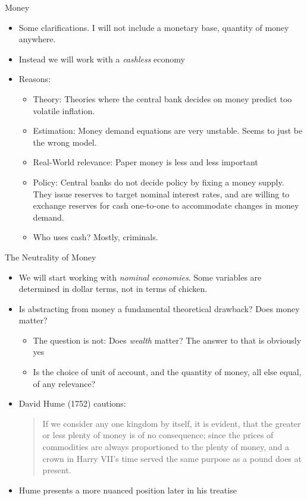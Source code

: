 \documentclass[11pt,aspectratio=169,xcolor={dvipsnames},hyperref={pdftex,pdfpagemode=UseNone,hidelinks,pdfdisplaydoctitle=true},usepdftitle=false]{beamer}
\begin{document}
\begin{frame}{Money}
\begin{itemize}
\item Some clarifications. I will not include a monetary base, quantity of money anywhere.
\item Instead we will work with a \textit{cashless} economy
\item Reasons:
\begin{itemize}
\item Theory: Theories where the central bank decides on money predict too volatile inflation.
\item Estimation: Money demand equations are very unstable. Seems to just be the wrong model.
\item Real-World relevance: Paper money is less and less important
\item Policy: Central banks do not decide policy by fixing a money supply. They issue reserves to target nominal interest rates, and are willing to exchange reserves for cash one-to-one to accommodate changes in money demand.
\item Who uses cash? Mostly, criminals.
\end{itemize}
\end{itemize}
\end{frame}

\begin{frame}{The Neutrality of Money}
\begin{itemize}
\item We will start working with \textit{nominal economies}. Some variables are determined in dollar terms, not in terms of chicken.
\item Is abstracting from money a fundamental theoretical drawback? Does money matter?
\begin{itemize}
\item The question is not: Does \textit{wealth} matter? The answer to that is obviously yes
\item Is the choice of unit of account, and the quantity of money, all else equal, of any relevance?
\end{itemize}
\item David Hume (1752) cautions:\\
\begin{quote}
\vspace{0.5cm}
If we consider any one kingdom by itself, it is evident, that the greater or less plenty
of money is of no consequence; since the prices of commodities are always proportioned to
the plenty of money, and a crown in Harry VII's time served the same purpose as a pound
does at present.
\end{quote}
\item Hume presents a more nuanced position later in his treatise
\end{itemize}
\end{frame}
\end{document}
